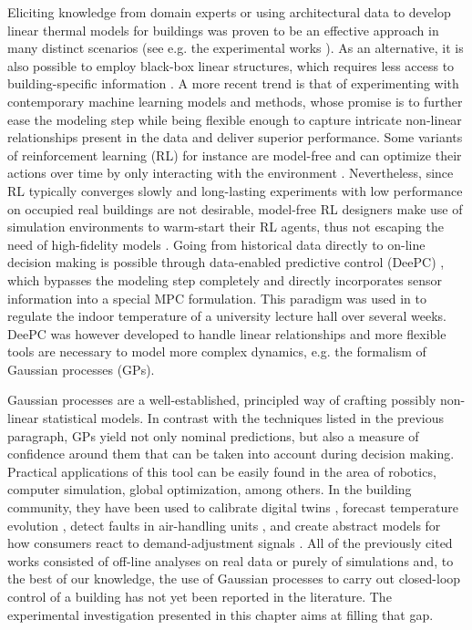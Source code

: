 Eliciting knowledge from domain experts or using architectural data to develop linear thermal models for buildings was proven to be an effective approach in many distinct scenarios (see e.g. the experimental works \cite{vavna2014model,bunning2022physics}). As an alternative, it is also possible to employ black-box linear structures, which requires less access to building-specific information \citep{fabietti2016experimental,fabietti2018multi}. A more recent trend is that of experimenting with contemporary machine learning models and methods, whose promise is to further ease the modeling step while being flexible enough to capture intricate non-linear relationships present in the data and deliver superior performance. Some variants of reinforcement learning (RL) for instance are model-free and can optimize their actions over time by only interacting with the environment \citep{du2021intelligent}. Nevertheless, since RL typically converges slowly and long-lasting experiments with low performance on occupied real buildings are not desirable, model-free RL designers make use of simulation environments to warm-start their RL agents, thus not escaping the need of high-fidelity models \citep{di2022lessons}. Going from historical data directly to on-line decision making is possible through data-enabled predictive control (DeePC)  \citep{coulson2019data}, which bypasses the modeling step completely and directly incorporates sensor information into a special MPC formulation. This paradigm was used in \cite{lian2021adaptive} to regulate the indoor temperature of a university lecture hall over several weeks. DeePC was however developed to handle linear relationships and more flexible tools are necessary to model more complex dynamics, e.g. the formalism of Gaussian processes (GPs).

Gaussian processes are a well-established, principled way of crafting possibly non-linear statistical models. In contrast with the techniques listed in the previous paragraph, GPs yield not only nominal predictions, but also a measure of confidence around them that can be taken into account during decision making. Practical applications of this tool can be easily found in the area of robotics, computer simulation, global optimization, among others. In the building community, they have been used to calibrate digital twins \citep{chakrabarty2021scalable}, forecast temperature evolution \citep{gray2016thermal}, detect faults in air-handling units \citep{van2017advanced}, and create abstract models for how consumers react to demand-adjustment signals \citep{nghiem2017data}. All of the previously cited works consisted of off-line analyses on real data or purely of simulations and, to the best of our knowledge, the use of Gaussian processes to carry out closed-loop control of a building has not yet been reported in the literature. The experimental investigation presented in this chapter aims at filling that gap.

